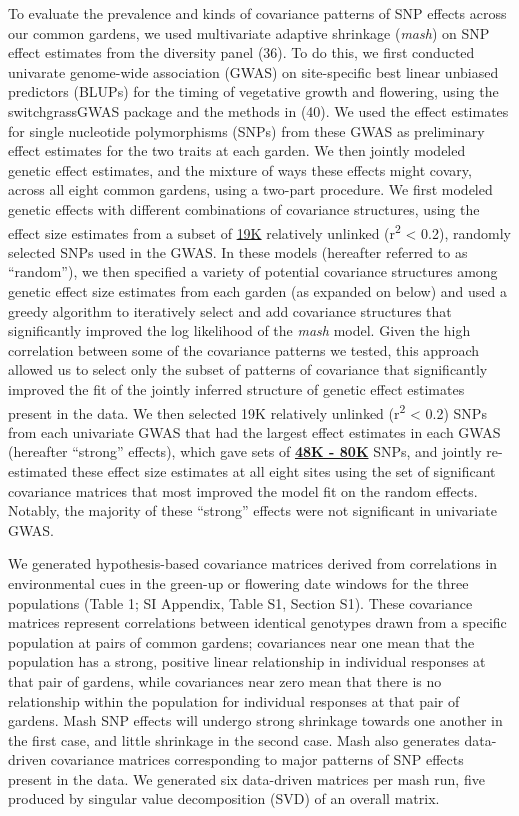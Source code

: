 \documentclass[
  9pt,
  twocolumn,
  twoside]{pnas-new}
\begin{document}
To evaluate the prevalence and kinds of covariance patterns of SNP
effects across our common gardens, we used multivariate adaptive
shrinkage (\emph{mash}) on SNP effect estimates from the diversity panel
(36). To do this, we first conducted univarate genome-wide association
(GWAS) on site-specific best linear unbiased predictors (BLUPs) for the
timing of vegetative growth and flowering, using the switchgrassGWAS
package and the methods in (40). We used the effect estimates for single
nucleotide polymorphisms (SNPs) from these GWAS as preliminary effect
estimates for the two traits at each garden. We then jointly modeled
genetic effect estimates, and the mixture of ways these effects might
covary, across all eight common gardens, using a two-part procedure. We
first modeled genetic effects with different combinations of covariance
structures, using the effect size estimates from a subset of \ul{19K}
relatively unlinked (r\textsuperscript{2} \textless{} 0.2), randomly
selected SNPs used in the GWAS. In these models (hereafter referred to
as ``random''), we then specified a variety of potential covariance
structures among genetic effect size estimates from each garden (as
expanded on below) and used a greedy algorithm to iteratively select and
add covariance structures that significantly improved the log likelihood
of the \emph{mash} model. Given the high correlation between some of the
covariance patterns we tested, this approach allowed us to select only
the subset of patterns of covariance that significantly improved the fit
of the jointly inferred structure of genetic effect estimates present in
the data. We then selected 19K relatively unlinked (r\textsuperscript{2}
\textless{} 0.2) SNPs from each univariate GWAS that had the largest
effect estimates in each GWAS (hereafter ``strong'' effects), which gave
sets of \ul{\textbf{48K - 80K}} SNPs, and jointly re-estimated these
effect size estimates at all eight sites using the set of significant
covariance matrices that most improved the model fit on the random
effects. Notably, the majority of these ``strong'' effects were not
significant in univariate GWAS.

We generated hypothesis-based covariance matrices derived from
correlations in environmental cues in the green-up or flowering date
windows for the three populations (Table 1; SI Appendix, Table S1,
Section S1). These covariance matrices represent correlations between
identical genotypes drawn from a specific population at pairs of common
gardens; covariances near one mean that the population has a strong,
positive linear relationship in individual responses at that pair of
gardens, while covariances near zero mean that there is no relationship
within the population for individual responses at that pair of gardens.
Mash SNP effects will undergo strong shrinkage towards one another in
the first case, and little shrinkage in the second case. Mash also
generates data-driven covariance matrices corresponding to major
patterns of SNP effects present in the data. We generated six
data-driven matrices per mash run, five produced by singular value
decomposition (SVD) of an overall matrix.
\end{document}

